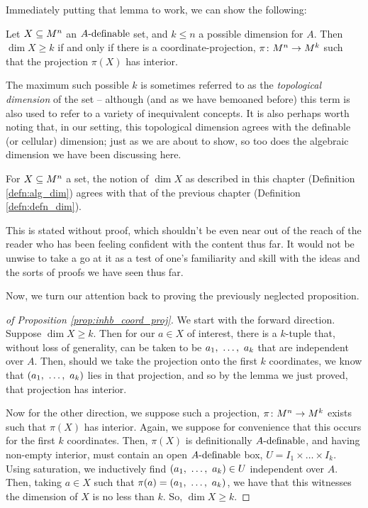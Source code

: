 Immediately putting that lemma to work, we can show the following:
\begin{proposition}
  Let $\XMn[X]{n}$ an $\Adefnb$ set, and $k \leq n$ a possible dimension for $A$. Then $\dim{X} \geq k$ if and only if there is a coordinate-projection, $\funcdom{\pi}{M^n}{M^k}$ such that the projection $\pi(X)$ has \inhb interior.
  \label{prop:inhb_coord_proj}
\end{proposition}

\begin{remark}
  The maximum such possible $k$ is sometimes referred to as the \emph{topological dimension} of the set -- although (and as we have bemoaned before) this term is also used to refer to a variety of inequivalent concepts. It is also perhaps worth noting that, in our setting, this topological dimension agrees with the definable (or cellular) dimension; just as we are about to show, so too does the algebraic dimension we have been discussing here.
\end{remark}

\begin{corollary}
  For $\XMn[X]{n}$ a  set, the notion of $\dim{X}$ as described in this chapter (Definition \ref{defn:alg_dim}) agrees with that of the previous chapter (Definition \ref{defn:defn_dim}).
  \label{cor:dim_agree}
\end{corollary}
This is stated without proof, which shouldn't be even near out of the reach of the reader who has been feeling confident with the content thus far. It would not be unwise to take a go at it as a test of one's familiarity and skill with the ideas and the sorts of proofs we have seen thus far.

Now, we turn our attention back to proving the previously neglected proposition.
\begin{proof}[of Proposition \ref{prop:inhb_coord_proj}]
  We start with the forward direction. Suppose $\dim{X} \geq k$. Then for our $a \in X$ of interest, there is a $k$-tuple that, without loss of generality, can be taken to be $\vonevm{a}{k}$ that are independent over $A$. Then, should we take the projection onto the first $k$ coordinates, we know that $(\vonevm{a}{k})$ lies in that projection, and so by the lemma we just proved, that projection has \inhb interior.

  Now for the other direction, we suppose such a projection, $\funcdom{\pi}{M^n}{M^k}$ exists such that $\pi(X)$ has \inhb interior. Again, we suppose for convenience that this occurs for the first $k$ coordinates. Then, $\pi(X)$ is definitionally $\Adefnb$, and having non-empty interior, must contain an open $\Adefnb$ box, $U = I_1 \times \hdots \times I_k$. Using saturation, we inductively find $(\vonevm{a}{k}) \in U$ independent over $A$. Then, taking $a \in X$ such that $\pi(a) = (\vonevm{a}{k})$, we have that this witnesses the dimension of $X$ is no less than $k$. So, $\dim{X} \geq k$.
\end{proof}


